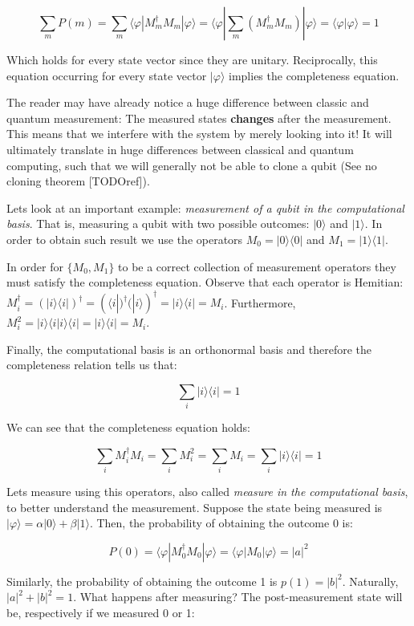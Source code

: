 $$ \sum_m P(m) = \sum_m \langle\varphi|M_m^\dagger M_m|\varphi\rangle = \langle\varphi|\sum_m (M_m^\dagger M_m)|\varphi\rangle = \langle\varphi|\varphi\rangle = 1 $$

Which holds for every state vector since they are unitary. Reciprocally, this equation occurring for every state vector $|\varphi\rangle$ implies the completeness equation.

The reader may have already notice a huge difference between classic and quantum measurement: The measured states \textbf{changes} after the measurement. This means that we interfere with the system by merely looking into it! It will ultimately translate in huge differences between classical and quantum computing, such that we will generally not be able to clone a qubit (See no cloning theorem [TODOref]).

Lets look at an important example: \emph{measurement of a qubit in the computational basis}. That is, measuring a qubit with two possible outcomes: $|0\rangle$ and $|1\rangle$. In order to obtain such result we use the operators $M_0 = |0\rangle \langle 0|$ and $M_1 = |1\rangle \langle 1|$.

In order for $\{M_0, M_1\}$ to be a correct collection of measurement operators they must satisfy the completeness equation. Observe that each operator is Hemitian: $M_i^\dagger = (|i\rangle \langle i|)^\dagger = (\langle i|)^\dagger (|i\rangle)^\dagger = |i\rangle \langle i| = M_i$. Furthermore, $M_i^2 = |i\rangle \langle i|i\rangle \langle i| = |i\rangle \langle i| = M_i$.

Finally, the computational basis is an orthonormal basis and therefore the completeness relation tells us that:

$$ \sum_i |i\rangle\langle i| = 1 $$

We can see that the completeness equation holds:

$$ \sum_i M_i^\dagger M_i = \sum_i M_i^2 = \sum_i M_i = \sum_i |i\rangle\langle i| = 1 $$

Lets measure using this operators, also called \emph{measure in the computational basis}, to better understand the measurement. Suppose the state being measured is $|\varphi\rangle = \alpha|0\rangle + \beta|1\rangle$. Then, the probability of obtaining the outcome 0 is:

$$ P(0) = \langle\varphi|M_0^\dagger M_0|\varphi\rangle = \langle\varphi|M_0|\varphi\rangle = |a|^2 $$

Similarly, the probability of obtaining the outcome 1 is $p(1) = |b|^2$. Naturally, $ |a|^2 + |b|^2 = 1$. What happens after measuring? The post-measurement state will be, respectively if we measured 0 or 1:

